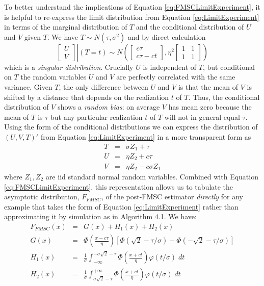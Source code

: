 \documentclass[12pt,letterpaper]{article}
\begin{document}
To better understand the implications of Equation \ref{eq:FMSCLimitExperiment}, it is helpful to re-express the limit distribution from Equation \ref{eq:LimitExperiment} in terms of the marginal distribution of $T$ and the conditional distribution of $U$ and $V$ given $T$. 
We have $T \sim N(\tau, \sigma^2)$ and by direct calculation
\begin{equation}
  \left.\left[
  \begin{array}{c}
   U \\ V 
  \end{array}
\right]\right| (T = t) \sim N\left(
\left[
\begin{array}{c}
  c \tau \\ c\tau - ct
\end{array}
\right], \eta^2
\left[
\begin{array}{cc}
  1 & 1 \\ 1 & 1
\end{array}
\right]
\right)
\label{eq:LimitExperimentConditional}
\end{equation}
which is a \emph{singular distribution}.
Crucially $U$ is independent of $T$, but conditional on $T$ the random variables $U$ and $V$ are perfectly correlated with the same variance.
Given $T$, the only difference between $U$ and $V$ is that the mean of $V$ is shifted by a distance that depends on the realization $t$ of $T$.
Thus, the conditional distribution of $V$ shows a \emph{random bias}: on average $V$ has mean zero because the mean of $T$ is $\tau$ but any particular realization $t$ of $T$ will not in general equal $\tau$.
Using the form of the conditional distributions we can express the distribution of $(U,V,T)'$ from Equation \ref{eq:LimitExperiment} in a more transparent form as
\begin{eqnarray*}
  T &=& \sigma Z_1 + \tau\\
  U &=& \eta Z_2 + c\tau\\
  V &=& \eta Z_2 - c\sigma Z_1
\end{eqnarray*}
where $Z_1, Z_2$ are iid standard normal random variables.
Combined with Equation \ref{eq:FMSCLimitExperiment}, this representation allows us to tabulate the asymptotic distribution, $F_{FMSC}$, of the post-FMSC estimator \emph{directly} for any example that takes the form of Equation \ref{eq:LimitExperiment} rather than approximating it by simulation as in Algorithm 4.1.
We have:
\begin{eqnarray}
  F_{FMSC}(x) &=& G(x) + H_1(x) + H_2(x) \\
  \label{eq:FFMSC}
  G(x) &=& \Phi\left( \frac{x - c\tau}{\eta} \right)\left[ \Phi( \sqrt{2} - \tau/\sigma) -  \Phi( -\sqrt{2} - \tau/\sigma )\right]\\
  \label{eq:GFMSC}
  H_1(x) &=& \frac{1}{\sigma}\int_{-\infty}^{-\sigma\sqrt{2} - \tau} \Phi\left( \frac{x + ct}{\eta}\right)\varphi(t/\sigma)\; dt\\
  \label{eq:H1FMSC}
  H_2(x) &=& \frac{1}{\sigma}\int^{+\infty}_{\sigma\sqrt{2} - \tau} \Phi\left( \frac{x + ct}{\eta}\right)\varphi(t/\sigma)\; dt
  \label{eq:H2FMSC}
\end{eqnarray}
\end{document}
